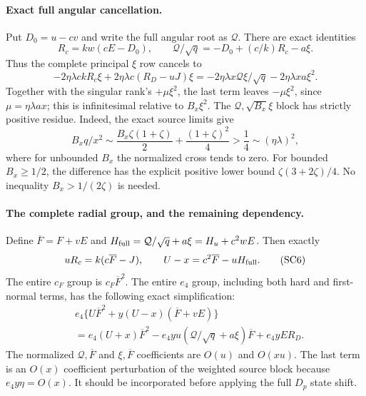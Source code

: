 \paragraph{Exact full angular cancellation.}
Put $D_0=u-cv$ and write the full angular root as $\mathcal Q$.
There are exact identities
\[
 R_c=kw(cE-D_0),\qquad
 \mathcal Q/\sqrt q=-D_0+(c/k)R_c-a\xi.
\]
Thus the complete principal $\xi$ row cancels to
\[
 -2\eta\lambda ckR_c\xi+2\eta\lambda c(R_D-uJ)\xi
 =-2\eta\lambda x\mathcal Q\xi/\sqrt q
                     -2\eta\lambda xa\xi^2.          \tag{SC5}
\]
Together with the singular rank's $+\mu\xi^2$, the last term leaves
$-\mu\xi^2$, since $\mu=\eta\lambda ax$; this is infinitesimal
relative to $B_x\xi^2$. The $\mathcal Q,\sqrt{B_x}\xi$ block
has strictly positive residue. Indeed, the exact source limits give
\[
 B_xq/x^2\sim
 \frac{B_x\zeta(1+\zeta)}2+\frac{(1+\zeta)^2}4
 >\frac14\sim(\eta\lambda)^2,
\]
where for unbounded $B_x$ the normalized cross tends to zero. For
bounded $B_x\ge1/2$, the difference has the explicit positive lower
bound $\zeta(3+2\zeta)/4$. No inequality
$B_x>1/(2\zeta)$ is needed.

\paragraph{The complete radial group, and the remaining dependency.}
Define $\overline F=F+vE$ and
$H_{\rm full}=\mathcal Q/\sqrt q+a\xi=H_u+c^2wE$.
Then exactly
\[
 uR_c=k(c\overline F-J),\qquad
 U-x=c^2\overline F-uH_{\rm full}.                    \tag{SC6}
\]
The entire $c_F$ group is $c_F\overline F^2$. The entire
$e_4$ group, including both hard and first-normal terms, has the
following exact simplification:
\[
\begin{split}
 &e_4\{U\overline F^2+y(U-x)(\overline F+vE)\}\\
 &=e_4(U+x)\overline F^2
   -e_4yu(\mathcal Q/\sqrt q+a\xi)\overline F
   +e_4yER_D.
\end{split}                                             \tag{SC7}
\]
The normalized $\mathcal Q,\overline F$ and
$\xi,\overline F$ coefficients are $O(u)$ and $O(xu)$.
The last term is an $O(x)$ coefficient perturbation of the weighted
source block because $e_4y\eta=O(x)$. It should be incorporated
before applying the full $D_p$ state shift.

